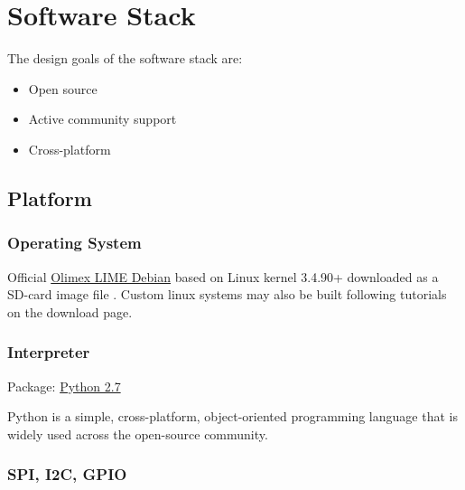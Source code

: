 \usepackage{listings}
\usepackage{color}




\section{Software Stack}

The design goals of the software stack are:
\begin{itemize}
\item Open source
\item Active community support
\item Cross-platform
\end{itemize}

\subsection{Platform}
\subsubsection{Operating System}
Official \href{https://www.olimex.com/wiki/A20-OLinuXino-LIME#How_to_generate_boot-able_SD-card_Debian_Linux_image_for_A20-OLinuXino-LIME.3F}{Olimex LIME Debian} based on Linux kernel 3.4.90+ downloaded as a SD-card image file . Custom linux systems may also be built following tutorials on the download page.

\subsubsection{Interpreter}

Package:	\href{https://www.python.org/downloads/release/python-279/}{Python 2.7}

Python is a simple, cross-platform, object-oriented programming language that is widely used across the open-source community.

\subsubsection{SPI, I2C, GPIO}
	
